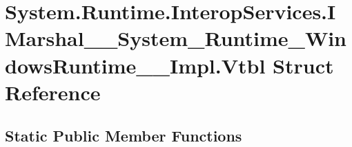 \hypertarget{struct_system_1_1_runtime_1_1_interop_services_1_1_i_marshal_____system___runtime___windows_runtime_____impl_1_1_vtbl}{}\section{System.\+Runtime.\+Interop\+Services.\+I\+Marshal\+\_\+\+\_\+\+System\+\_\+\+Runtime\+\_\+\+Windows\+Runtime\+\_\+\+\_\+\+Impl.\+Vtbl Struct Reference}
\label{struct_system_1_1_runtime_1_1_interop_services_1_1_i_marshal_____system___runtime___windows_runtime_____impl_1_1_vtbl}
\subsection*{Static Public Member Functions}

